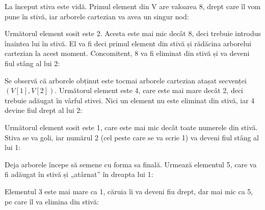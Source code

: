 La început stiva este vidă. Primul element din V are valoarea 8, drept care îl
vom pune în stivă, iar arborele cartezian va avea un singur nod:


Următorul element sosit este 2. Acesta este mai mic decât 8, deci trebuie
introdus înaintea lui în stivă. El va fi deci primul element din stivă și
rădăcina arborelui cartezian la acest moment. Concomitent, 8 va fi eliminat
din stivă și va deveni fiul stâng al lui 2:


Se observă că arborele obținut este tocmai arborele cartezian atașat secvenței
$(V[1], V[2])$. Următorul element este 4, care este mai mare decât 2, deci
trebuie adăugat în vârful stivei. Nici un element nu este eliminat din stivă,
iar 4 devine fiul drept al lui 2:


Următorul element sosit este 1, care este mai mic decât toate numerele din
stivă. Stiva se va goli, iar numărul 2 (cel peste care se va scrie 1) va
deveni fiul stâng al lui 1:


Deja arborele începe să semene cu forma sa finală. Urmează elementul 5, care
va fi adăugat în stivă și „atârnat” în dreapta lui 1:


Elementul 3 este mai mare ca 1, căruia îi va deveni fiu drept, dar mai mic ca
5, pe care îl va elimina din stivă:


